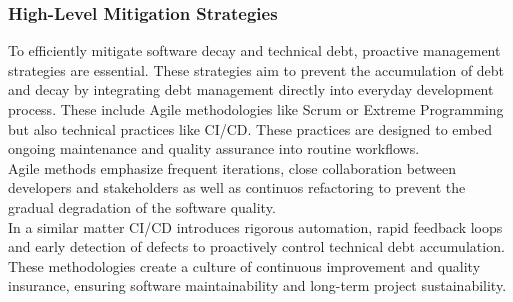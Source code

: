 \subsubsection{High-Level Mitigation Strategies}
To efficiently mitigate software decay and technical debt, proactive management strategies are essential. These strategies aim to prevent the accumulation of debt and decay
by integrating debt management directly into everyday development process. These include Agile methodologies like Scrum or Extreme Programming but also technical practices
like \ac{CI/CD}. These practices are designed to embed ongoing maintenance and quality assurance into routine workflows.\\
Agile methods emphasize frequent iterations, close collaboration between developers and stakeholders as well as continuos refactoring to prevent the
gradual degradation of the software quality.\\
In a similar matter \ac{CI/CD} introduces rigorous automation, rapid feedback loops and early detection of defects to proactively control technical debt accumulation.
These methodologies create a culture of continuous improvement and quality insurance, ensuring software maintainability and long-term project sustainability.\\

